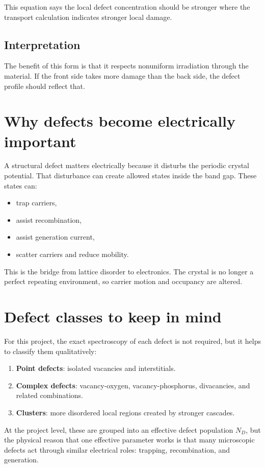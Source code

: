 \documentclass[11pt]{article}
\begin{document}
This equation says the local defect concentration should be stronger where the transport calculation indicates stronger local damage.

\subsection{Interpretation}
The benefit of this form is that it respects nonuniform irradiation through the material. If the front side takes more damage than the back side, the defect profile should reflect that.

\section{Why defects become electrically important}
A structural defect matters electrically because it disturbs the periodic crystal potential. That disturbance can create allowed states inside the band gap. These states can:
\begin{itemize}
    \item trap carriers,
    \item assist recombination,
    \item assist generation current,
    \item scatter carriers and reduce mobility.
\end{itemize}

This is the bridge from lattice disorder to electronics. The crystal is no longer a perfect repeating environment, so carrier motion and occupancy are altered.

\section{Defect classes to keep in mind}
For this project, the exact spectroscopy of each defect is not required, but it helps to classify them qualitatively:
\begin{enumerate}[label=\arabic*.]
    \item \textbf{Point defects}: isolated vacancies and interstitials.
    \item \textbf{Complex defects}: vacancy-oxygen, vacancy-phosphorus, divacancies, and related combinations.
    \item \textbf{Clusters}: more disordered local regions created by stronger cascades.
\end{enumerate}

At the project level, these are grouped into an effective defect population $N_D$, but the physical reason that one effective parameter works is that many microscopic defects act through similar electrical roles: trapping, recombination, and generation.
\end{document}
